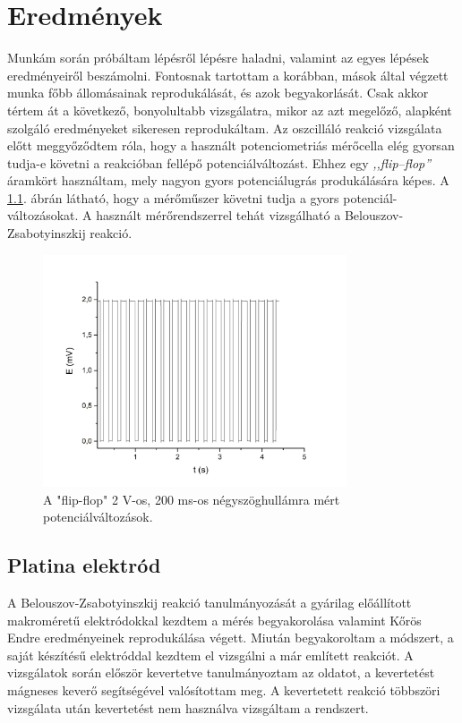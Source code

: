 \chapter{Eredmények}
\pagestyle{headings}

\def\s{0.5}
Munkám során próbáltam lépésről lépésre haladni, valamint az egyes lépések eredményeiről beszámolni. Fontosnak tartottam a korábban, mások által végzett munka főbb állomásainak reprodukálását, és azok begyakorlását. Csak akkor tértem át a következő, bonyolultabb vizsgálatra, mikor az azt megelőző, alapként szolgáló eredményeket sikeresen reprodukáltam. Az oszcilláló reakció vizsgálata előtt meggyőződtem róla, hogy a használt potenciometriás mérőcella elég gyorsan tudja-e követni a reakcióban fellépő potenciálváltozást. Ehhez egy \emph{,,flip--flop''} áramkört használtam, mely nagyon gyors potenciálugrás produkálására képes. A \ref{fig:square}. ábrán látható, hogy a mérőműszer követni tudja a gyors potenciál-változásokat. A használt mérőrendszerrel tehát vizsgálható a Belouszov-Zsabotyinszkij reakció.

\begin{figure}
\centering
\includegraphics[width=0.8\textwidth]{img/square.jpg}
\caption{A "flip-flop" 2 V-os, 200 ms-os négyszöghullámra mért potenciálváltozások.}
\label{fig:square}
\end{figure}

\section{Platina elektród}
A Belouszov-Zsabotyinszkij reakció tanulmányozását a gyárilag előállított makroméretű elektródokkal kezdtem a mérés begyakorolása valamint Kőrös Endre eredményeinek \cite{noyes1972oscillations} reprodukálása végett. Miután begyakoroltam a módszert, a saját készítésű elektróddal kezdtem el vizsgálni a már említett reakciót. A vizsgálatok során először kevertetve tanulmányoztam az oldatot, a kevertetést mágneses keverő segítségével valósítottam meg. A kevertetett reakció többszöri vizsgálata után kevertetést nem használva vizsgáltam a rendszert.

